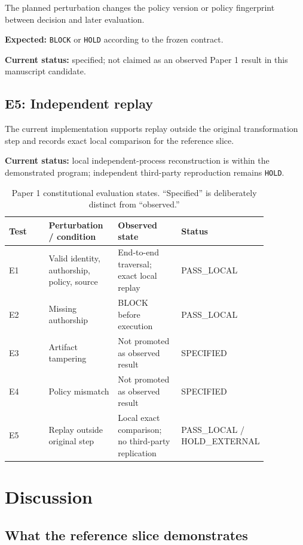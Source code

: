 \documentclass[11pt]{article}
\begin{document}
The planned perturbation changes the policy version or policy fingerprint between decision and later evaluation.

\textbf{Expected:} \texttt{BLOCK} or \texttt{HOLD} according to the frozen contract.

\textbf{Current status:} specified; not claimed as an observed Paper 1 result in this manuscript candidate.

\subsection{E5: Independent replay}

The current implementation supports replay outside the original transformation step and records exact local comparison for the reference slice.

\textbf{Current status:} local independent-process reconstruction is within the demonstrated program; independent third-party reproduction remains \texttt{HOLD}.

\begin{table}[h]
\centering
\small
\begin{tabular}{p{0.16\linewidth}p{0.27\linewidth}p{0.25\linewidth}p{0.18\linewidth}}
\toprule
\textbf{Test} & \textbf{Perturbation / condition} & \textbf{Observed state} & \textbf{Status} \\
\midrule
E1 & Valid identity, authorship, policy, source & End-to-end traversal; exact local replay & PASS\_LOCAL \\
E2 & Missing authorship & BLOCK before execution & PASS\_LOCAL \\
E3 & Artifact tampering & Not promoted as observed result & SPECIFIED \\
E4 & Policy mismatch & Not promoted as observed result & SPECIFIED \\
E5 & Replay outside original step & Local exact comparison; no third-party replication & PASS\_LOCAL / HOLD\_EXTERNAL \\
\bottomrule
\end{tabular}
\caption{Paper 1 constitutional evaluation states. ``Specified'' is deliberately distinct from ``observed.''}
\end{table}

\section{Discussion}

\subsection{What the reference slice demonstrates}
\end{document}
